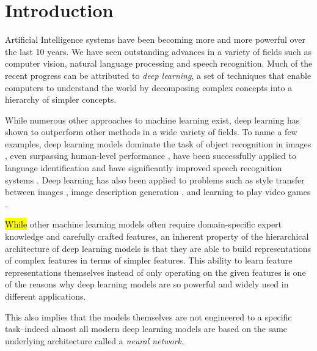 \section{Introduction}
Artificial Intelligence systems have been becoming more and more powerful over the last 10 years. We have seen outstanding advances in a variety of fields such as computer vision, natural language processing and speech recognition. Much of the recent progress can be attributed to \textit{deep learning}, a set of techniques that enable computers to understand the world by decomposing complex concepts into a hierarchy of simpler concepts.

While numerous other approaches to machine learning exist, deep learning has shown to outperform other methods in a wide variety of fields. To name a few examples, deep learning models dominate the task of object recognition in images \cite{DBLP:journals/ijcv/RussakovskyDSKS15}, even surpassing human-level performance \cite{DBLP:conf/iccv/HeZRS15}, have been successfully applied to language identification \cite{DBLP:conf/interspeech/Gonzalez-DominguezLSGM14} and
have significantly improved speech recognition systems \cite{DBLP:journals/taslp/MohamedDH12}. Deep learning has also been applied to problems such as style transfer between images \cite{DBLP:conf/cvpr/GatysEB16}, image description generation \cite{DBLP:journals/pami/KarpathyF17}, and learning to play video games \cite{DBLP:journals/nature/MnihKSRVBGRFOPB15}.

\hl{While} other machine learning models often require domain-specific expert knowledge and carefully crafted features, an inherent property of the hierarchical architecture of deep learning models is that they are able to build representations of complex features in terms of simpler features. This ability to learn feature representations themselves instead of only operating on the given features is one of the reasons why deep learning models are so powerful and widely used in different applications.

This also implies that the models themselves are not engineered to a specific task--indeed almost all modern deep learning models are based on the same underlying architecture called a \textit{neural network}.

